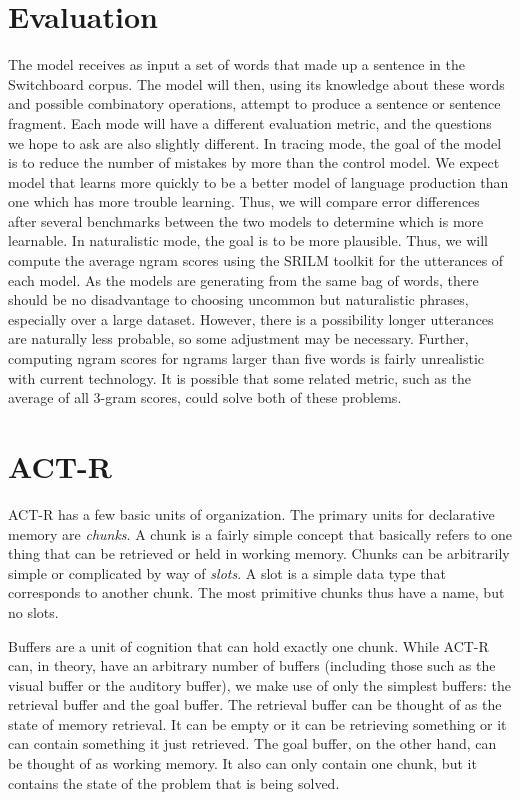 \section{Evaluation}
The model receives as input a set of words that made up a sentence in the Switchboard corpus. The model will then, using its knowledge about these words and possible combinatory operations, attempt to produce a sentence or sentence fragment. Each mode will have a different evaluation metric, and the questions we hope to ask are also slightly different. In tracing mode, the goal of the model is to reduce the number of mistakes by more than the control model. We expect model that learns more quickly to be a better model of language production than one which has more trouble learning. Thus, we will compare error differences after several benchmarks between the two models to determine which is more learnable. In naturalistic mode, the goal is to be more plausible. Thus, we will compute the average ngram scores using the SRILM toolkit \citep{srilm} for the utterances of each model. As the models are generating from the same bag of words, there should be no disadvantage to choosing uncommon but naturalistic phrases, especially over a large dataset. However, there is a possibility longer utterances are naturally less probable, so some adjustment may be necessary. Further, computing ngram scores for ngrams larger than five words is fairly unrealistic with current technology. It is possible that some related metric, such as the average of all 3-gram scores, could solve both of these problems. 

\section{ACT-R}
ACT-R has a few basic units of organization. The primary units for declarative memory are \textit{chunks}. A chunk is a fairly simple concept that basically refers to one thing that can be retrieved or held in working memory. Chunks can be arbitrarily simple or complicated by way of \textit{slots}. A slot is a simple data type that corresponds to another chunk. The most primitive chunks thus have a name, but no slots. 

Buffers are a unit of cognition that can hold exactly one chunk. While ACT-R can, in theory, have an arbitrary number of buffers (including those such as the visual buffer or the auditory buffer), we make use of only the simplest buffers: the retrieval buffer and the goal buffer. The retrieval buffer can be thought of as the state of memory retrieval. It can be empty or it can be retrieving something or it can contain something it just retrieved. The goal buffer, on the other hand, can be thought of as working memory. It also can only contain one chunk, but it contains the state of the problem that is being solved. 

